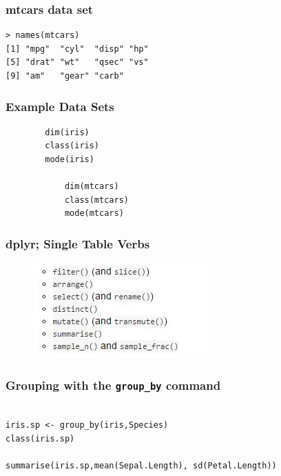 \documentclass{beamer}
\begin{document}
\begin{frame}[fragile]
\frametitle{mtcars data set}
\begin{verbatim}
> names(mtcars)
[1] "mpg"  "cyl"  "disp" "hp"  
[5] "drat" "wt"   "qsec" "vs"  
[9] "am"   "gear" "carb"
\end{verbatim}
\end{frame}
	\begin{frame}[fragile]
	\frametitle{Example Data Sets}
		\begin{verbatim}
		dim(iris)
		class(iris)
		mode(iris)
		
			dim(mtcars)
			class(mtcars)
			mode(mtcars)
		\end{verbatim}
	\end{frame}
\begin{frame}
\frametitle{dplyr; Single Table Verbs}
	\begin{figure}
\centering
\includegraphics[width=0.7\linewidth]{singletableverbs}

\end{figure}

\end{frame}
\begin{frame}[fragile]
\frametitle{Grouping with the \texttt{group\_by} command}
\begin{verbatim}
	
iris.sp <- group_by(iris,Species)
class(iris.sp)
		
summarise(iris.sp,mean(Sepal.Length), sd(Petal.Length))

\end{verbatim}
\end{frame}
\end{document}
